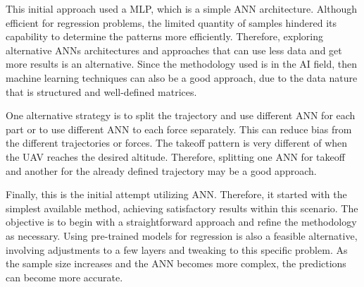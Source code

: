 This initial approach used a MLP, which is a  simple ANN architecture.
Although efficient for regression problems, the limited quantity of samples hindered its capability to determine the patterns more efficiently.
Therefore, exploring alternative ANNs architectures and approaches that can use less data and get more results is an alternative.
Since the methodology used is in the AI field, then machine learning techniques can also be a good approach, due to the data nature that is structured and well-defined matrices.

One alternative strategy is to split the trajectory and use different ANN for each part or to use different ANN to each force separately. 
This can reduce bias from the different trajectories or forces.
The takeoff pattern is very different of when the UAV reaches the desired altitude.
Therefore, splitting one ANN for takeoff and another for the already defined trajectory may be a good approach.


Finally, this is the initial attempt utilizing ANN. 
Therefore, it started with the simplest available method, achieving satisfactory results within this scenario. The objective is to begin with a straightforward approach and refine the methodology as necessary. Using pre-trained models for regression is also a feasible alternative, involving adjustments to a few layers and tweaking to this specific problem. As the sample size increases and the ANN becomes more complex, the predictions can become more accurate.







